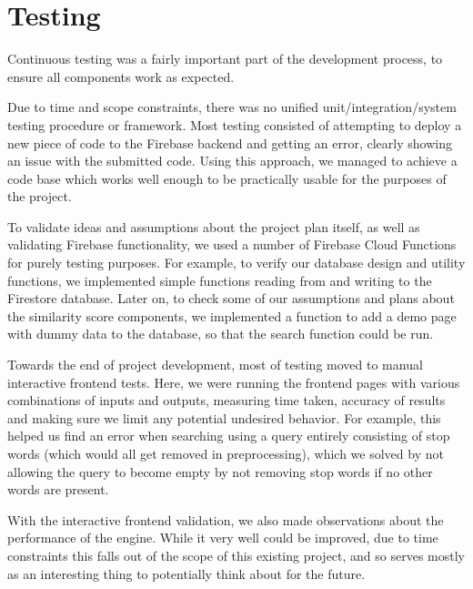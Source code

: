 \section{Testing}

Continuous testing was a fairly important part of the development process, to ensure all components work as expected.

Due to time and scope constraints, there was no unified unit/integration/system testing procedure or framework.
Most testing consisted of attempting to deploy a new piece of code to the Firebase backend and getting an error, clearly showing an issue with the submitted code.
Using this approach, we managed to achieve a code base which works well enough to be practically usable for the purposes of the project.

To validate ideas and assumptions about the project plan itself, as well as validating Firebase functionality, we used a number of Firebase Cloud Functions for purely testing purposes.
For example, to verify our database design and utility functions, we implemented simple functions reading from and writing to the Firestore database.
Later on, to check some of our assumptions and plans about the similarity score components, we implemented a function to add a demo page with dummy data to the database, so that the search function could be run.

Towards the end of project development, most of testing moved to manual interactive frontend tests.
Here, we were running the frontend pages with various combinations of inputs and outputs, measuring time taken, accuracy of results and making sure we limit any potential undesired behavior.
For example, this helped us find an error when searching using a query entirely consisting of stop words (which would all get removed in preprocessing), which we solved by not allowing the query to become empty by not removing stop words if no other words are present.

With the interactive frontend validation, we also made observations about the performance of the engine.
While it very well could be improved, due to time constraints this falls out of the scope of this existing project, and so serves mostly as an interesting thing to potentially think about for the future.
